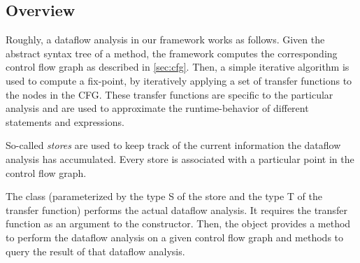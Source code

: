 \subsection{Overview}

Roughly, a dataflow analysis in our framework works as follows. Given the abstract syntax
tree of a method, the framework computes the corresponding control flow graph as
described in \autoref{sec:cfg}. Then, a simple iterative algorithm is used to compute
a fix-point, by iteratively applying a set of transfer functions to the nodes in the
CFG. These transfer functions are specific to the particular analysis and are used
to approximate the runtime-behavior of different statements and expressions.

So-called \emph{stores} are used to keep track of the current information the dataflow
analysis has accumulated. Every store is associated with a particular point in the
control flow graph.

The class  (parameterized by the type \code S of the store and the type \code T of the
transfer function) performs the actual dataflow analysis. It requires the transfer function
as an argument to the constructor. Then, the object provides a method to perform the dataflow
analysis on a given control flow graph and methods to query the result of that dataflow analysis.




